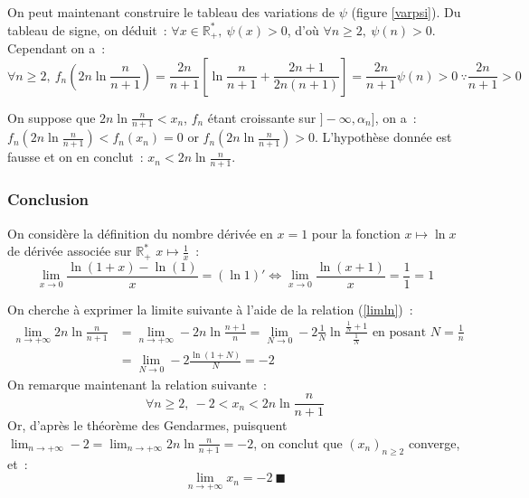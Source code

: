 \documentclass{article}
\begin{document}
  On peut maintenant construire le tableau des variations de $\psi$ (figure \ref{varpsi}). Du tableau de signe, on déduit~: $\forall x\in\mathbb{R}_+^*,\ \psi(x)>0$, d'où $\forall n\geqslant2,\ \psi(n)>0$. Cependant on a~:
  \begin{displaymath}
    \forall n\geqslant2,\ f_n\left(2n\ln\frac{n}{n+1}\right)=\frac{2n}{n+1}\left[\ln\frac{n}{n+1}+\frac{2n+1}{2n(n+1)}\right]=\frac{2n}{n+1}\psi(n)>0\ \because\frac{2n}{n+1}>0
  \end{displaymath}

  On suppose que $2n\ln\frac{n}{n+1}<x_n$, $f_n$ étant croissante sur $]-\infty,\alpha_n]$, on a~: $f_n\left(2n\ln\frac{n}{n+1}\right)<f_n(x_n)=0$ or $f_n\left(2n\ln\frac{n}{n+1}\right)>0$. L'hypothèse donnée est fausse et on en conclut~: $x_n<2n\ln\frac{n}{n+1}$.

  \subsubsection{Conclusion}
  On considère la définition du nombre dérivée en $x=1$ pour la fonction $x\mapsto\ln x$ de dérivée associée sur $\mathbb{R}_+^*$ $x\mapsto\frac{1}{x}$~:
  \begin{equation}\label{limln}
    \lim_{x\to 0}\frac{\ln(1+x)-\ln(1)}{x}=(\ln 1)'\iff \lim_{x\to 0}\frac{\ln{(x+1)}}{x}=\frac{1}{1}=1
  \end{equation}

  On cherche à exprimer la limite suivante à l'aide de la relation (\ref{limln})~:
  \begin{align*}
    \lim_{n\to+\infty}2n\ln\frac{n}{n+1}&=\lim_{n\to+\infty}-2n\ln\frac{n+1}{n} =\lim_{N\to 0}-2\frac{1}{N}\ln\frac{\frac{1}{N}+1}{\frac{1}{N}}\text{ en posant }N=\frac{1}{n}\\
    &=\lim_{N\to 0}-2 \frac{\ln(1+N)}{N}=-2
  \end{align*}
  On remarque maintenant la relation suivante~:
  \begin{displaymath}
    \forall n\geqslant2,\ -2<x_n<2n\ln\frac{n}{n+1}
  \end{displaymath}
  Or, d'après le théorème des Gendarmes, puisquent $\lim_{n\to+\infty}-2=\lim_{n\to+\infty}2n\ln\frac{n}{n+1}=-2$, on conclut que $(x_n)_{n\geqslant2}$ converge, et~:
  \begin{displaymath}
    \lim_{n\to+\infty}x_n=-2\ \blacksquare
  \end{displaymath}
\end{document}
